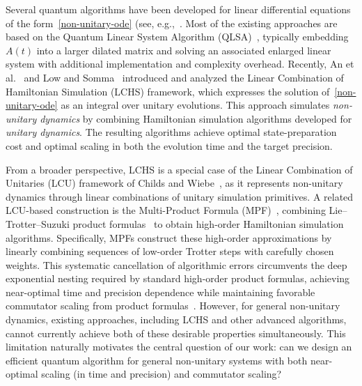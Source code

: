 \documentclass[10pt,reqno]{article}
\numberwithin{equation}{section}
\theoremstyle{plain}
\theoremstyle{definition}
\begin{document}
Several quantum algorithms have been developed for linear differential equations of the form~\cref{non-unitary-ode} (see, e.g.,~\cite{Berry2014,BerryChildsOstranderEtAl2017,childs2020quantum,Krovi2022,fang2023time,berry2024quantum,jin2024quantum,LowSu2026}. Most of the existing approaches are based on the Quantum Linear System Algorithm (QLSA)~\cite{harrow2009quantum,childs2017QLSA,Costa2023QLSA,Dalzell2024}, typically embedding \(A(t)\) into a larger dilated matrix and solving an associated enlarged linear system with additional implementation and complexity overhead. Recently, An et al.~\cite{an2023LCHS,an2023LCHS-Optimal} and Low and Somma~\cite{low2025optimallchs} introduced and analyzed the Linear Combination of Hamiltonian Simulation (LCHS) framework, which expresses the solution of~\cref{non-unitary-ode} as an integral over unitary evolutions. This approach simulates \emph{non-unitary dynamics} by combining Hamiltonian simulation algorithms developed for \emph{unitary dynamics}. The resulting algorithms achieve optimal state-preparation cost and optimal scaling in both the evolution time and the target precision. 

From a broader perspective, LCHS is a special case of the Linear Combination of Unitaries (LCU) framework of Childs and Wiebe~\cite{Childs2012lcu}, as it represents non-unitary dynamics through linear combinations of unitary simulation primitives.  A related LCU-based construction is the Multi-Product Formula (MPF)~\cite{low2019wellconditioned,aftab2024mpf,mizuta2024MPFtimedep,mizuta2025commutatorscalinghamiltoniansimulation}, combining Lie--Trotter--Suzuki product formulas~\cite{lloyd1996quantumsimulation} to obtain high-order Hamiltonian simulation algorithms.  Specifically, MPFs construct these high-order approximations by linearly combining sequences of low-order Trotter steps with carefully chosen weights.  This systematic cancellation of algorithmic errors circumvents the deep exponential nesting required by standard high-order product formulas, achieving near-optimal time and precision dependence while maintaining favorable commutator scaling from product formulas~\cite{Childs2021theorytrotter}.  However, for general non-unitary dynamics, existing approaches, including LCHS and other advanced algorithms, cannot currently achieve both of these desirable properties simultaneously.  This limitation naturally motivates the central question of our work: can we design an efficient quantum algorithm for general non-unitary systems with both near-optimal scaling (in time and precision) and commutator scaling?
\end{document}
